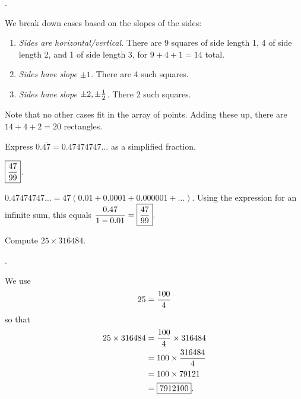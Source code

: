 \documentclass[11pt]{article}
\DeclareRobustCommand{\frac}[3][0pt]{%
  {\begingroup\hspace{#1}#2\hspace{#1}\endgroup\over\hspace{#1}#3\hspace{#1}}}
\begin{document}
\begin{answer} . \end{answer}
\begin{solution}
We break down cases based on the slopes of the sides:
\begin{enumerate}
\item \emph{Sides are horizontal/vertical.} There are 9 squares of side length 1, 4 of side length 2, and 1 of side length 3, for $9 + 4 + 1 = 14$ total.
\item \emph{Sides have slope $\pm 1$.} There are 4 such squares.
\item \emph{Sides have slope $\pm 2, \pm \frac{1}{2}$.} There 2 such squares.
\end{enumerate}
Note that no other cases fit in the array of points. Adding these up, there are $14 + 4 + 2 = \boxed{20}$ rectangles.
\end{solution}

\begin{problem}Express $0.\overline{47} = 0.47474747\ldots$ as a simplified fraction.
\end{problem}

\begin{answer} $\boxed{\displaystyle \frac{47}{99}}$. \end{answer}

\begin{solution}
$\displaystyle 0.47474747\ldots = 47(0.01 + 0.0001 + 0.000001 + \ldots)$. Using the expression for an infinite sum, this equals $\displaystyle \frac{0.47}{1 - 0.01} = \boxed{\frac{47}{99}}.$
\end{solution}


\begin{problem}Compute $25 \times 316484$.
\end{problem}
\begin{answer}
.
\end{answer}
\begin{solution}
We use
$$25 = \frac{100}{4}$$
so that
\begin{align*}
25 \times 316484 &= \frac{100}{4} \times 316484 \\
&= 100 \times \frac{316484}{4} \\
&= 100 \times 79121 \\
&= \boxed{7912100}.
\end{align*}
\end{solution}
\end{document}
